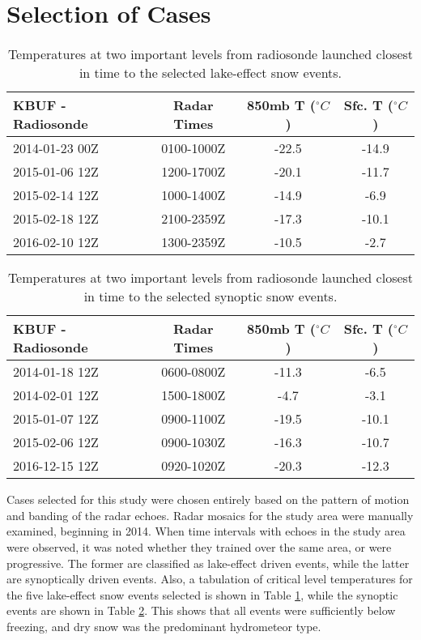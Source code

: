\section{Selection of Cases}
\begin{table}[h]
    \caption{Temperatures at two important levels from radiosonde launched closest in time to the selected lake-effect snow events.}\label{eventslake}
    \begin{center}
    \begin{tabular}{|l|c|c|c|}
    \hline
     KBUF - Radiosonde & Radar Times & 850mb T ($^{\circ}C$) & Sfc. T ($^{\circ}C$)\\
    \hline\hline
    2014-01-23 00Z & 0100-1000Z & -22.5 & -14.9 \\
    \hline
    2015-01-06 12Z & 1200-1700Z & -20.1 & -11.7 \\
    \hline
    2015-02-14 12Z & 1000-1400Z & -14.9 & -6.9 \\
    \hline
    2015-02-18 12Z & 2100-2359Z & -17.3 & -10.1 \\
    \hline
    2016-02-10 12Z & 1300-2359Z & -10.5 & -2.7 \\
    \hline
    \end{tabular}
    \end{center}
\end{table}
\begin{table}[h]
    \caption{Temperatures at two important levels from radiosonde launched closest in time to the selected synoptic snow events.}\label{synopticevents}
    \begin{center}
    \begin{tabular}{|l|c|c|c|}
    \hline
     KBUF - Radiosonde & Radar Times & 850mb T ($^{\circ}C$) & Sfc. T ($^{\circ}C$)\\
    \hline\hline
    2014-01-18 12Z & 0600-0800Z & -11.3 & -6.5 \\
    \hline
    2014-02-01 12Z & 1500-1800Z & -4.7 & -3.1 \\
    \hline
    2015-01-07 12Z & 0900-1100Z & -19.5 & -10.1 \\
    \hline
    2015-02-06 12Z & 0900-1030Z & -16.3 & -10.7 \\
    \hline
    2016-12-15 12Z & 0920-1020Z & -20.3 & -12.3 \\
    \hline
    \end{tabular}
    \end{center}
\end{table}
Cases selected for this study were chosen entirely based on the pattern of motion and banding of the radar echoes. Radar mosaics for the study area were
manually examined, beginning in 2014. When time intervals with echoes in the study area were observed, it was noted whether they trained over the same area,
or were progressive. The former are classified as lake-effect driven events, while the latter are synoptically driven events. Also, a tabulation of critical
level temperatures for the five lake-effect snow events selected is shown in Table \ref{eventslake}, while the synoptic events are shown in Table
\ref{synopticevents}. This shows that all events were sufficiently below freezing, and dry snow was the predominant hydrometeor type.
